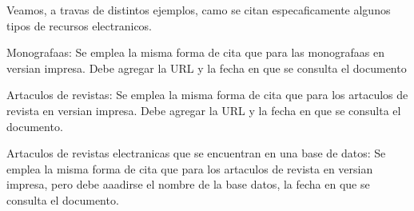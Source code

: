 Veamos, a travas de distintos ejemplos, camo se citan especaficamente algunos tipos de recursos electranicos.

Monografaas:
Se emplea la misma forma de cita que para las monografaas en versian impresa. Debe agregar la URL y la fecha en que se consulta el documento

Artaculos de revistas:
Se emplea la misma forma de cita que para los artaculos de revista en versian impresa. Debe agregar la URL y la fecha en que se consulta el documento.

Artaculos de revistas electranicas que se encuentran en una base de datos:
Se emplea la misma forma de cita que para los artaculos de revista en versian impresa, pero debe aaadirse el nombre de la base datos, la fecha en que se consulta el documento.